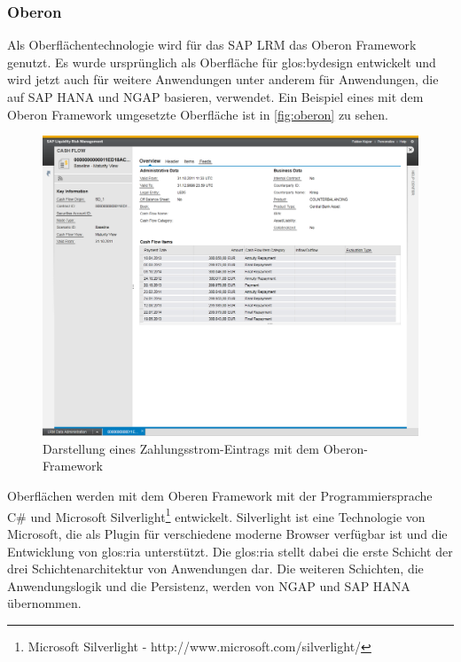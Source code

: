 \begin{onehalfspacing}
\subsubsection{Oberon}
Als Oberflächentechnologie wird für das SAP LRM das Oberon Framework genutzt. Es wurde ursprünglich als Oberfläche für \gls{glos:bydesign} entwickelt und wird jetzt auch für weitere Anwendungen unter anderem für Anwendungen, die auf SAP HANA und \gls{NGAP} basieren, verwendet. Ein Beispiel eines mit dem Oberon Framework umgesetzte Oberfläche ist in \vref{fig:oberon} zu sehen.

\begin{figure}[h]
\centering
\setlength{\unitlength}{1mm}
\includegraphics[width=15cm]{images/OberonUI.png}
\caption{Darstellung eines Zahlungsstrom-Eintrags mit dem Oberon-Framework\label{fig:oberon}}
\end{figure} 

Oberflächen werden mit dem Oberen Framework mit der Programmiersprache C\# und Microsoft Silverlight\footnote{Microsoft Silverlight - http://www.microsoft.com/silverlight/} entwickelt. Silverlight ist eine Technologie von Microsoft, die als Plugin für verschiedene moderne Browser verfügbar ist und die Entwicklung von \gls{glos:ria} unterstützt. Die \gls{glos:ria} stellt dabei die erste Schicht der drei Schichtenarchitektur von Anwendungen dar. Die weiteren Schichten, die Anwendungslogik und die Persistenz, werden von \gls{NGAP} und SAP HANA übernommen.


\end{onehalfspacing}

